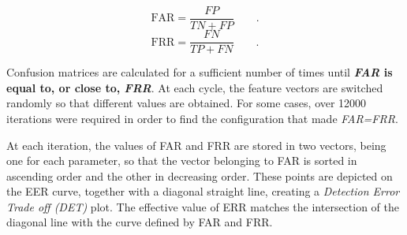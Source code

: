 \begin{equation}
\text{FAR}=\dfrac{FP}{TN+FP} \qquad.
\label{eq:FAR}
\end{equation}
\begin{equation}
\text{FRR}=\dfrac{FN}{TP+FN} \qquad.
\label{eq:FRR}
\end{equation}
\par Confusion matrices are calculated for a sufficient number of times until \textbf{\textit{FAR} is equal to, or close to, \textit{FRR}}. At each cycle, the feature vectors are switched randomly so that different values are obtained. For some cases, over 12000 iterations were required in order to find the configuration that made \textit{FAR=FRR}.
\\
\par At each iteration, the values of FAR and FRR are stored in two vectors, being one for each parameter, so that the vector belonging to FAR is sorted in ascending order and the other in decreasing order. These points are depicted on the EER curve, together with a diagonal straight line, creating a \textit{Detection Error Trade off (DET)} plot. The effective value of ERR matches the intersection of the diagonal line with the curve defined by FAR and FRR.
